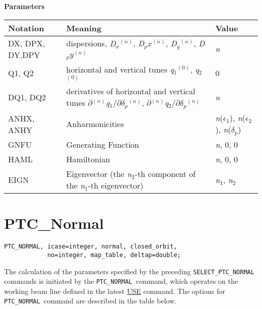 {\bf Parameters} \\
\begin{tabular}{p{2cm} p{7cm} p{2cm}}
  \hline 
  \textbf{Notation} & \textbf{Meaning} & \textbf{Value} \\ 
  \hline
  DX, DPX, DY,DPY & 
  dispersions, \textit{D$_x$}$^{(n)}$,
  \textit{D$_px$}$^{(n)}$, \textit{D$_y$}$^{(n)}$,
  \textit{D$_py$}$^{(n)}$ & \textit{n} \\ 
  \hline
  Q1, Q2 & 
  horizontal and vertical tunes \textit{q}$_1$$^{(0)}$,
  \textit{q}$_2$$^{(0)}$ &  0 \\  
  \hline
  DQ1, DQ2 & 
  derivatives of horizontal and vertical tunes
  $\partial$$^{(n)}$\textit{q}$_1$/$\partial$\textit{$\delta$}$_\textit{p}$$^{(n)}$,
  $\partial$$^{(n)}$\textit{q}$_2$/$\partial$\textit{$\delta$}$_\textit{p}$$^{(n)}$
  & \textit{n} \\  
  \hline
  ANHX, ANHY 
  & Anharmonicities &
  \textit{n}(\textit{$\epsilon$}$_1$),
  \textit{n}(\textit{$\epsilon$}$_2$),
  \textit{n}(\textit{$\delta$}$_\textit{p}$) \\  
  \hline
  GNFU & Generating Function & \textit{n}, 0, 0 \\ 
  \hline
  HAML & Hamiltonian  & \textit{n}, 0, 0 \\ 
  \hline
  EIGN & Eigenvector (the \textit{n}$_2$-th component of the
  \textit{n}$_1$-th eigenvector) & \textit{n}$_1$, \textit{n}$_2$
  \\  
  \hline
\end{tabular}




\section{PTC\_Normal}

\begin{verbatim}
PTC_NORMAL, icase=integer, normal, closed_orbit, 
            no=integer, map_table, deltap=double;
\end{verbatim}

The calculation of the parameters specified by the preceding
\texttt{SELECT\_PTC\_NORMAL } commands is initiated by the
\texttt{PTC\_NORMAL }command, which operates on the working beam
line defined in the latest \href{../control/general.html#use}{
  USE} command. The options for \texttt{PTC\_NORMAL }command are
described in the table below.  

